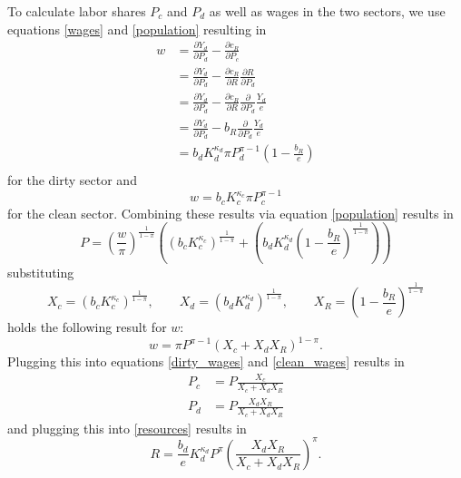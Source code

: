 To calculate labor shares $P_c$ and $P_d$ as well as wages in the two sectors, we use equations \eqref{wages} and \eqref{population} resulting in
\begin{align}
	w &= \frac{\partial Y_d}{\partial P_d} - \frac{\partial c_R}{\partial P_c} \nonumber \\
	&= \frac{\partial Y_d}{\partial P_d} - \frac{\partial c_R}{\partial R} \frac{\partial R}{\partial P_d} \nonumber \\
	&= \frac{\partial Y_d}{\partial P_d} - \frac{\partial c_R}{\partial R} \frac{\partial}{\partial P_d} \frac{Y_d}{e} \nonumber \\
	&= \frac{\partial Y_d}{\partial P_d} - b_R \frac{\partial}{\partial P_d} \frac{Y_d}{e} \nonumber \\
	&= b_d K_d^{\kappa_d} \pi P_d^{\pi-1}\left( 1-\frac{b_R}{e} \right) \\
	\label{dirty_wages}
\end{align}
for the dirty sector and
\begin{equation}
	w = b_c K_c^{\kappa_c} \pi P_c^{\pi-1}
	\label{clean_wages}
\end{equation}
for the clean sector. Combining these results via equation \eqref{population} results in
\begin{equation}
	P = \left( \frac{w}{\pi} \right)^{\frac{1}{1-\pi}}\left( \left( b_c K_c^{\kappa_c} \right)^{\frac{1}{1-\pi}} + \left( b_d K_d^{\kappa_d} \left( 1 - \frac{b_R}{e} \right)^{\frac{1}{1-\pi}} \right) \right)
\end{equation}
substituting 
\begin{equation}
	X_c = (b_c K_c^{\kappa_c})^{\frac{1}{1-\pi}}, \qquad X_d = (b_d K_d^{\kappa_d})^{\frac{1}{1-\pi}}, \qquad X_R = \left( 1 - \frac{b_R}{e} \right)^{\frac{1}{1-\pi}}
	\label{substitutions}
\end{equation}
holds the following result for $w$:
\begin{equation}
	w = \pi P^{\pi-1}\left( X_c + X_d X_R \right)^{1-\pi}.
	\label{wage_result}
\end{equation}
Plugging this into equations \eqref{dirty_wages} and \eqref{clean_wages} results in 
\begin{align}
	P_c &= P \frac{X_c}{X_c + X_d X_R} \label{clean_labor} \\
	P_d &= P \frac{X_d X_R}{X_c + X_d X_R} \label{dirty_labor}
\end{align}
and plugging this into \eqref{resources} results in
\begin{equation}
	R = \frac{b_d}{e}K_d^{\kappa_d}P^{\pi}\left( \frac{X_d X_R}{X_c + X_d X_R} \right)^{\pi}.
	\label{R_result}
\end{equation}
